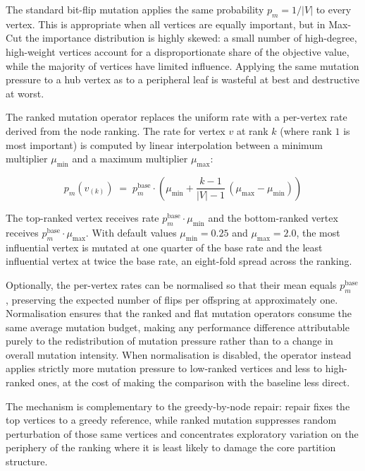 \documentclass[12pt]{article}
\begin{document}
The standard bit-flip mutation applies the same probability $p_m = 1/|V|$ to every
vertex.
This is appropriate when all vertices are equally important, but in Max-Cut the
importance distribution is highly skewed: a small number of high-degree, high-weight
vertices account for a disproportionate share of the objective value, while the
majority of vertices have limited influence.
Applying the same mutation pressure to a hub vertex as to a peripheral leaf is
wasteful at best and destructive at worst.

The ranked mutation operator replaces the uniform rate with a per-vertex rate derived
from the node ranking.
The rate for vertex $v$ at rank $k$ (where rank $1$ is most important) is computed
by linear interpolation between a minimum multiplier $\mu_{\min}$ and a maximum
multiplier $\mu_{\max}$:

\begin{equation}
    p_m(v_{(k)}) \;=\; p_m^{\text{base}} \cdot
    \left( \mu_{\min} + \frac{k-1}{|V|-1}\,(\mu_{\max} - \mu_{\min}) \right)
\end{equation}

The top-ranked vertex receives rate $p_m^{\text{base}} \cdot \mu_{\min}$ and the
bottom-ranked vertex receives $p_m^{\text{base}} \cdot \mu_{\max}$.
With default values $\mu_{\min} = 0.25$ and $\mu_{\max} = 2.0$, the most influential
vertex is mutated at one quarter of the base rate and the least influential vertex at
twice the base rate, an eight-fold spread across the ranking.

Optionally, the per-vertex rates can be normalised so that their mean equals
$p_m^{\text{base}}$, preserving the expected number of flips per offspring at
approximately one.
Normalisation ensures that the ranked and flat mutation operators consume the same
average mutation budget, making any performance difference attributable purely to
the redistribution of mutation pressure rather than to a change in overall mutation
intensity.
When normalisation is disabled, the operator instead applies strictly more mutation
pressure to low-ranked vertices and less to high-ranked ones, at the cost of making
the comparison with the baseline less direct.

The mechanism is complementary to the greedy-by-node repair: repair fixes the top
vertices to a greedy reference, while ranked mutation suppresses random perturbation
of those same vertices and concentrates exploratory variation on the periphery of
the ranking where it is least likely to damage the core partition structure.
\end{document}
